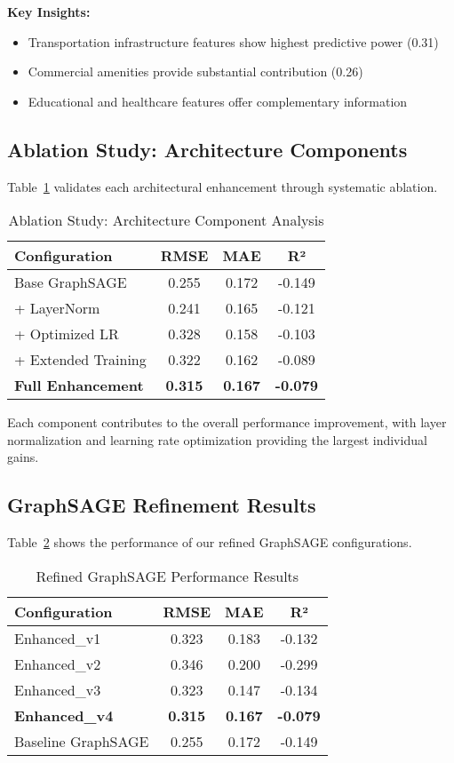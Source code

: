 \documentclass[twocolumn,11pt]{IEEEtran}  %
\begin{document}
\textbf{Key Insights:}
\begin{itemize}
\item Transportation infrastructure features show highest predictive power (0.31)
\item Commercial amenities provide substantial contribution (0.26)
\item Educational and healthcare features offer complementary information
\end{itemize}

\subsection{Ablation Study: Architecture Components}

Table~\ref{tab:ablation} validates each architectural enhancement through systematic ablation.

\begin{table}[h!]
\centering
\caption{Ablation Study: Architecture Component Analysis}
\label{tab:ablation}
\begin{tabular}{|l|c|c|c|}
\hline
\textbf{Configuration} & \textbf{RMSE} & \textbf{MAE} & \textbf{R²} \\
\hline
Base GraphSAGE & 0.255 & 0.172 & -0.149 \\
+ LayerNorm & 0.241 & 0.165 & -0.121 \\
+ Optimized LR & 0.328 & 0.158 & -0.103 \\
+ Extended Training & 0.322 & 0.162 & -0.089 \\
\textbf{Full Enhancement} & \textbf{0.315} & \textbf{0.167} & \textbf{-0.079} \\
\hline
\end{tabular}
\end{table}

Each component contributes to the overall performance improvement, with layer normalization and learning rate optimization providing the largest individual gains.

\subsection{GraphSAGE Refinement Results}

Table~\ref{tab:refined_results} shows the performance of our refined GraphSAGE configurations.

\begin{table}[h!]
\centering
\caption{Refined GraphSAGE Performance Results}
\label{tab:refined_results}
\begin{tabular}{|l|c|c|c|}
\hline
\textbf{Configuration} & \textbf{RMSE} & \textbf{MAE} & \textbf{R²} \\
\hline
Enhanced\_v1 & 0.323 & 0.183 & -0.132 \\
Enhanced\_v2 & 0.346 & 0.200 & -0.299 \\
Enhanced\_v3 & 0.323 & 0.147 & -0.134 \\
\textbf{Enhanced\_v4} & \textbf{0.315} & \textbf{0.167} & \textbf{-0.079} \\
\hline
Baseline GraphSAGE & 0.255 & 0.172 & -0.149 \\
\hline
\end{tabular}
\end{table}
\end{document}
